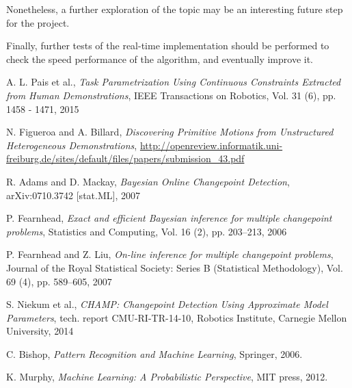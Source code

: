 \documentclass[11pt,twoside,a4paper]{report}
\begin{document}
Nonetheless, a further exploration of the topic may be an interesting future step for the project.

Finally, further tests of the real-time implementation should be performed to check the speed performance of the algorithm, and eventually improve it.


\clearpage 
\begin{thebibliography}{9}

A. L. Pais et al., \textit{Task Parametrization Using Continuous Constraints Extracted from Human Demonstrations},
IEEE Transactions on Robotics, Vol. 31 (6), pp. 1458 - 1471, 2015

N. Figueroa and A. Billard, \textit{Discovering Primitive Motions from Unstructured Heterogeneous Demonstrations},
\url{http://openreview.informatik.uni-freiburg.de/sites/default/files/papers/submission_43.pdf}

R. Adams and D. Mackay, \textit{Bayesian Online Changepoint Detection},
arXiv:0710.3742 [stat.ML], 2007

P. Fearnhead, \textit{Exact and efficient Bayesian inference for multiple changepoint problems},
Statistics and Computing,
Vol. 16 (2), pp. 203–213, 2006

P. Fearnhead and Z. Liu, \textit{On-line inference for multiple changepoint problems},
Journal of the Royal Statistical Society: Series B (Statistical Methodology), 
Vol. 69 (4), pp. 589–605, 2007

S. Niekum et al., \textit{CHAMP: Changepoint Detection Using
Approximate Model Parameters},
tech. report CMU-RI-TR-14-10, Robotics Institute, Carnegie Mellon University, 2014

C. Bishop, \textit{Pattern Recognition and Machine Learning}, Springer, 2006.

K. Murphy, \textit{Machine Learning: A Probabilistic Perspective}, MIT press, 2012.

\end{thebibliography}
\end{document}
